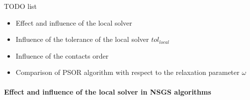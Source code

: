 \begin{ndrva}
TODO list
\begin{itemize}
\item Effect and influence of the local solver
\item Influence of the tolerance of the local solver $tol_{local}$
\item Influence of the contacts order
\item Comparison of PSOR algorithm with respect to the relaxation parameter $\omega$
\end{itemize}
\end{ndrva}

\paragraph{Effect and influence of the local solver in NSGS algorithms}




